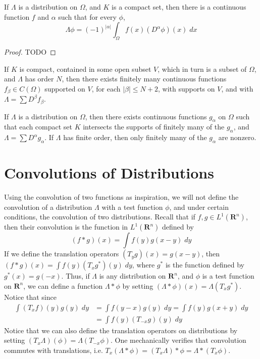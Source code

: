 \begin{theorem}
    If $\Lambda$ is a distribution on $\Omega$, and $K$ is a compact set, then there is a continuous function $f$ and $\alpha$ such that for every $\phi$,
    \[ \Lambda \phi = (-1)^{|\alpha|} \int_\Omega f(x) (D^\alpha \phi)(x)\; dx \]
\end{theorem}
\begin{proof}
    TODO
\end{proof}

\begin{theorem}
    If $K$ is compact, contained in some open subset $V$, which in turn is a subset of $\Omega$, and $\Lambda$ has order $N$, then there exists finitely many continuous functions $f_\beta \in C(\Omega)$ supported on $V$, for each $|\beta| \leq N + 2$, with supports on $V$, and with $\Lambda = \sum D^\beta f_\beta$.
\end{theorem}

\begin{theorem}
    If $\Lambda$ is a distribution on $\Omega$, then there exists continuous functions $g_\alpha$ on $\Omega$ such that each compact set $K$ intersects the supports of finitely many of the $g_\alpha$, and $\Lambda = \sum D^\alpha g_\alpha$. If $\Lambda$ has finite order, then only finitely many of the $g_\alpha$ are nonzero.
\end{theorem}

\section{Convolutions of Distributions}

Using the convolution of two functions as inspiration, we will not define the convolution of a distribution $\Lambda$ with a test function $\phi$, and under certain conditions, the convolution of two distributions. Recall that if $f,g \in L^1(\mathbf{R}^n)$, then their convolution is the function in $L^1(\mathbf{R}^n)$ defined by
%
\[ (f * g)(x) = \int f(y) g(x - y)\; dy \]
%
If we define the translation operators $(T_y g)(x) = g(x-y)$, then $(f * g)(x) = \int f(y) (T_x g^*)(y)\; dy$, where $g^*$ is the function defined by $g^*(x) = g(-x)$. Thus, if $\Lambda$ is any distribution on $\mathbf{R}^n$, and $\phi$ is a test function on $\mathbf{R}^n$, we can define a function $\Lambda * \phi$ by setting $(\Lambda * \phi)(x) = \Lambda(T_x g^*)$. Notice that since
%
\begin{align*}
    \int (T_x f)(y) g(y)\; dy &= \int f(y-x) g(y)\; dy = \int f(y) g(x+y)\; dy\\
    &= \int f(y) (T_{-x}g)(y)\; dy
\end{align*}
%
Notice that we can also define the translation operators on distributions by setting $(T_x \Lambda)(\phi) = \Lambda (T_{-x} \phi)$. One mechanically verifies that convolution commutes with translations, i.e. $T_x (\Lambda * \phi) = (T_x \Lambda) * \phi = \Lambda * (T_x \phi)$.

